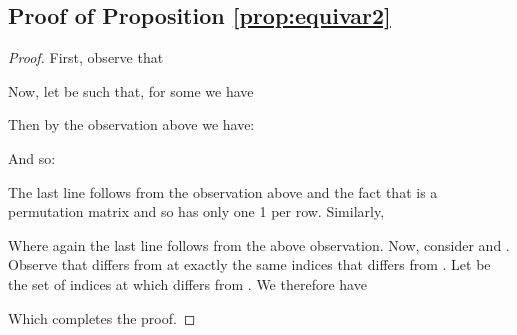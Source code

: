 \documentclass{article}
\theoremstyle{definition}
\newtheorem*{proof}{Proof}\newcommand{\fix}{\marginpar{FIX}}
\begin{document}
\subsection{Proof of Proposition \ref{prop:equivar2}}
\begin{proof}
First, observe that 

  Now, let  be such that, for some  we have
    
  Then by the observation above we have:
    
  And so: 
  
  The last line follows from the observation above and the fact that  is a permutation matrix and so has only one 1 per row. Similarly, 
   
  Where again the last line follows from the above observation. Now, consider  and . Observe that  differs from  at exactly the same indices that  differs from . Let  be the set of indices at which  differs from . We therefore have 
  
  Which completes the proof. 
\end{proof}
\end{document}
